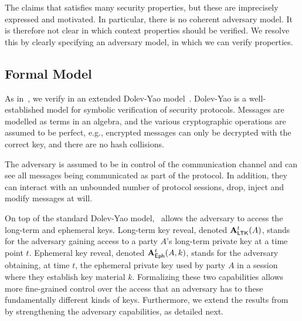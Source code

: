The \mEdhoc{} \mSpec{} \cite{our-analysis-selander-lake-edhoc-00} claims
that \mEdhoc{} satisfies many security properties, but these are imprecisely
expressed and motivated.
%
In particular, there is no coherent adversary model.
%
It is therefore not clear in which context properties should be verified.
%
We resolve this by clearly specifying an adversary model, in which we can 
verify
properties.
%

\subsection{Formal Model}\label{sec:threat-model}
As in~\cite{Norr21}, we verify \mEdhoc{} in an extended
Dolev-Yao model~\cite{DY83}.
%
Dolev-Yao is a well-established model for symbolic verification of security
protocols.
%
Messages are modelled as terms in an algebra, and the various cryptographic
operations are assumed to be perfect, e.g., encrypted messages can only be
decrypted with the correct key, and there are no hash collisions.
%

The adversary is assumed to be in control of the communication
channel and can see all messages being communicated as part of the protocol.
%
In addition, they can interact with an unbounded number of protocol sessions,
drop, inject and modify messages at will.
%

On top of the standard Dolev-Yao model,~\cite{Norr21} allows the adversary to
access the long-term and ephemeral keys.
%
Long-term key reveal, denoted $\mathbf{A}_{\textsf{LTK}}^{t}(A)$, stands for the adversary
gaining access to a party $A$'s long-term private key  at a time point $t$.
%
Ephemeral key reveal, denoted $\mathbf{A}_{\textsf{Eph}}^{t}(A, k)$, stands for the adversary
obtaining, at time $t$, the ephemeral private key  used by party $A$
in a session where they establish key material $k$.
%
%
Formalizing these two capabilities allows more fine-grained control
over the access that an adversary has to these fundamentally different kinds of
keys.
%
Furthermore, we extend the results from~\cite{Norr21} by strengthening the
adversary capabilities, as detailed next.
%

